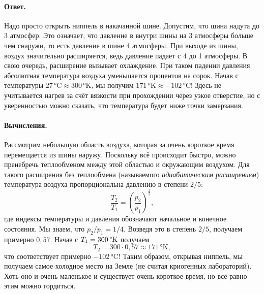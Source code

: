 \paragraph{Ответ.}
Надо просто открыть ниппель в накачанной шине.
Допустим, что шина надута до 3 атмосфер.
Это означает, что давление в внутри шины на 3 атмосферы больше чем снаружи, то есть давление в шине 4 атмосферы.
При выходе из шины, воздух значительно расширяется, ведь давление падает с 4 до 1 атмосферы.
В свою очередь, расширение вызывает охлаждение.
При таком падении давления абсолютная температура воздуха уменьшается процентов на сорок.
Начав с температуры $27 \,\text{°C} \approx 300\, \text{°K}$, мы получим $171 \,\text{°K} \approx -102\, \text{°C}$!
Здесь не учитывается нагрев за счёт вязкости при прохождении через узкое отверстие, но с уверенностью можно сказать, что температура будет ниже точки замерзания.

\paragraph{Вычисления.}
Рассмотрим небольшую область воздуха, которая за очень короткое время перемещается из шины наружу.
Поскольку всё происходит быстро, можно пренебречь теплообменом между этой областью и окружающим воздухом.
Для такого расширения без теплообмена (называемого \emph{адиабатическим расширением}) температура воздуха пропорциональна давлению в степени $2/5$:
\[\frac{T_2}{T_1} = \left(\frac{p_2}{p_1}\right)^{\tfrac{2}{5}},\]
где индексы температуры и давления обозначают начальное и конечное состояния.
Мы знаем, что $p_2/p_1=1/4$.
Возведя это в степень $2/5$, получаем примерно $0{,}57$.
Начав с $T_1 = 300 \,\degree\text{K}$ получаем
\[T_2 = 300 \cdot 0{,}57 \approx 171 \,\text{°K},\]
что соответствует примерно $-102\, \text{°C}$!
Таким образом, открывая ниппель, мы получаем самое холодное место на Земле (не считая криогенных лабораторий).
Хоть оно и очень маленькое и существует очень короткое время, но всё равно этим можно гордиться.
